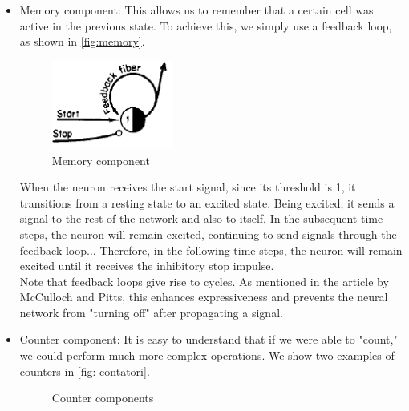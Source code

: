 \documentclass[10pt]{article}
\begin{document}
\begin{itemize}
	\item Memory component: This allows us to remember that a certain cell was active in the previous state. To achieve this, we simply use a feedback loop, as shown in \autoref{fig:memory}.


\begin{figure}[!t]
	\centering
	\includegraphics[width=4cm]{Immagini/memory.png}
	\caption{Memory component}
	\label{fig:memory}
\end{figure}



When the neuron receives the start signal, since its threshold is 1, it transitions from a resting state to an excited state. Being excited, it sends a signal to the rest of the network and also to itself. In the subsequent time steps, the neuron will remain excited, continuing to send signals through the feedback loop$\ldots$ Therefore, in the following time steps, the neuron will remain excited until it receives the inhibitory stop impulse.\\
Note that feedback loops give rise to cycles. As mentioned in the article by McCulloch and Pitts, this enhances expressiveness and prevents the neural network from "turning off" after propagating a signal.
\item Counter component: It is easy to understand that if we were able to "count," we could perform much more complex operations. We show two examples of counters in \autoref{fig: contatori}.

\begin{figure}[!t]
	\centering
	\hspace{5mm}
	\caption{Counter components}
	\label{fig: contatori}
\end{figure}


\end{itemize}
\end{document}
